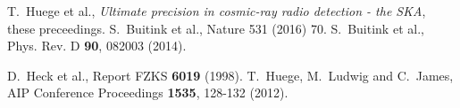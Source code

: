 \documentclass[epj]{webofc}
\begin{document}
%
% 
%
%
\vspace{-0.3cm}
\begin{thebibliography}{}
\vspace{-0.2cm}
%
%
T.~Huege et al., \textit{Ultimate precision in cosmic-ray radio detection - the SKA}, these preceedings.
%
S.~Buitink et al., Nature 531 (2016) 70.
%
S.~Buitink et al., Phys. Rev. D \textbf{90}, 082003 (2014).

D.~Heck et al., Report FZKS \textbf{6019} (1998).
%
T.~Huege, M.~Ludwig and C.~James, AIP Conference Proceedings \textbf{1535}, 128-132 (2012).
%
\end{thebibliography}
\end{document}
